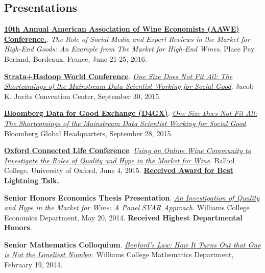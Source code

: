 \documentclass[margin,line]{res}
\begin{document}
\begin{resume}
\section{\sc Presentations}
\href{http://www.wine-economics.org/2016-bordeaux/}{{\bf 10th Annual American Association of Wine Economists (AAWE) Conference.}}. {\it The Role of Social Media and Expert Reviews in the Market for High-End Goods: An Example from The Market for High-End Wines}. Place Pey Berland, Bordeaux, France, June 21-25, 2016.

\vspace{-.25cm}
\href{http://strataconf.com/}{{\bf Strata+Hadoop World Conference}}. \href{https://thelittledataset.files.wordpress.com/2015/01/levine_albright_poster1.png}{{\it One Size Does Not Fit All: The Shortcomings of the Mainstream Data Scientist Working for Social Good}}. Jacob K. Javits Convention Center, September 30, 2015.

\vspace{-.25cm}
\href{http://www.bloomberg.com/company/d4gx/}{{\bf Bloomberg Data for Good Exchange (D4GX)}}. \href{https://thelittledataset.files.wordpress.com/2015/01/levine_albright_poster1.png}{{\it One Size Does Not Fit All: The Shortcomings of the Mainstream Data Scientist Working for Social Good}}. Bloomberg Global Headquarters, September 28, 2015.

\vspace{-.25cm}
\href{http://connectedlife.oii.ox.ac.uk/}{{\bf Oxford Connected Life Conference}}. \href{https://thelittledataset.files.wordpress.com/2015/01/ocl-poster1.png}{{\it Using an Online Wine Community to Investigate the Roles of Quality and Hype in the Market for Wine}}. Balliol College, University of Oxford, June 4, 2015. \href{http://connectedlife.oii.ox.ac.uk/wine/ }{{\bf Received Award for Best Lightning Talk.}}

\vspace{-.25cm}
{\bf Senior Honors Economics Thesis Presentation}.  \href{https://thelittledataset.files.wordpress.com/2015/01/thesisposter.png}{{\it An Investigation of Quality and Hype in the Market for Wine: A Panel SVAR Approach}}. Williams College Economics Department, May 20, 2014. {\bf Received Highest Departmental Honors}.

\vspace{-.25cm}
{\bf Senior Mathematics Colloquium}. \href{https://www.youtube.com/watch?v=YIQOvAqFFLo}{{\it Benford's Law: How It Turns Out that One is Not the Loneliest Number}}. Williams College Mathematics Department, February 19, 2014.


\end{resume}
\end{document}
